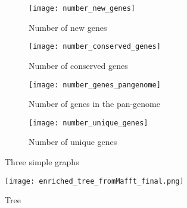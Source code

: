 \graphicspath{{images/pangenomeAnalysis/}{images/phylogeneticStructureHostData}}


\begin{figure}[h!] 
     \centering
     \begin{subfigure}[b]{0.45\textwidth}
        \centering
        \texttt{[image: number\_new\_genes]}
        \caption{Number of new genes}
        \label{fig:new genes}
     \end{subfigure}
     \hfill
     \begin{subfigure}[b]{0.45\textwidth}
        \centering
        \texttt{[image: number\_conserved\_genes]}
        \caption{Number of conserved genes}
        \label{fig:conserved genes}
     \end{subfigure}
     \hfill
     \begin{subfigure}[b]{0.45\textwidth}
        \centering
        \texttt{[image: number\_genes\_pangenome]}
        \caption{Number of genes in the pan-genome}
        \label{fig:pagenome genes}
     \end{subfigure}
     \hfill
     \begin{subfigure}[b]{0.45\textwidth}
        \centering
        \texttt{[image: number\_unique\_genes]}
        \caption{Number of unique genes}
        \label{fig:unique genes}
     \end{subfigure}
     \hfill
      \caption{Three simple graphs}
      \label{fig:genes vs genomes}
\end{figure}




\begin{figure}
   \centering
   \texttt{[image: enriched\_tree\_fromMafft\_final.png]}
   \caption{Tree}
   \label{core alignement mafft tree}
\end{figure}


